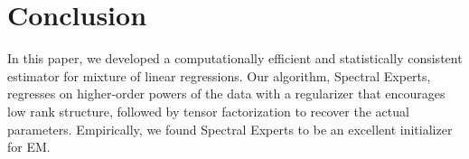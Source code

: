\section{Conclusion}
\label{sec:conclusion}

In this paper, we developed a computationally efficient and statistically
consistent estimator for mixture of linear regressions.
Our algorithm, Spectral
Experts, regresses on higher-order powers of the data with a regularizer that
encourages low rank structure, followed by tensor factorization to recover the
actual parameters.  Empirically, we found Spectral Experts 
to be an excellent initializer for EM.
